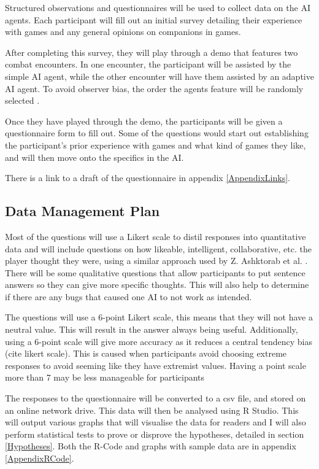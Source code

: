 \documentclass{IEEEtran}
\begin{document}
Structured observations and questionnaires will be used to collect data on the AI agents. Each participant will fill out an initial survey detailing their experience with games and any general opinions on companions in games.

After completing this survey, they will play through a demo that features two combat encounters. In one encounter, the participant will be assisted by the simple AI agent, while the other encounter will have them assisted by an adaptive AI agent. To avoid observer bias, the order the agents feature will be randomly selected \cite{hrobjartsson2013observer}.

Once they have played through the demo, the participants will be given a questionnaire form to fill out. Some of the questions would start out establishing the participant's prior experience with games and what kind of games they like, and will then move onto the specifics in the AI.

There is a link to a draft of the questionnaire in appendix \ref{AppendixLinks}.

\subsection{Data Management Plan}
\label{DataManagement}

Most of the questions will use a Likert scale to distil responses into quantitative data and will include questions on how likeable, intelligent, collaborative, etc. the player thought they were, using a similar approach used by Z. Ashktorab et al. \cite{SocialPerceptions2020}. There will be some qualitative questions that allow participants to put sentence answers so they can give more specific thoughts. This will also help to determine if there are any bugs that caused one AI to not work as intended.

The questions will use a 6-point Likert scale, this means that they will not have a neutral value. This will result in the answer always being useful. Additionally, using a 6-point scale will give more accuracy as it reduces a central tendency bias (cite likert scale). This is caused when participants avoid choosing extreme responses to avoid seeming like they have extremist values. Having a point scale more than 7 may be less manageable for participants

The responses to the questionnaire will be converted to a csv file, and stored on an online network drive. This data will then be analysed using R Studio. This will output various graphs that will visualise the data for readers and I will also perform statistical tests to prove or disprove the hypotheses, detailed in section \ref{Hypotheses}. Both the R-Code and graphs with sample data are in appendix \ref{AppendixRCode}.
\end{document}
